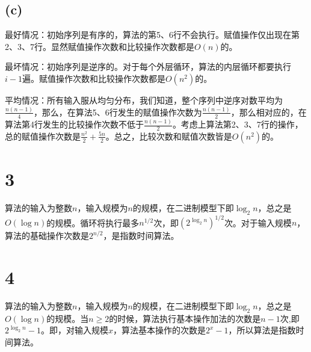 \documentclass{ctexart}
\begin{document}
\subsection*{(c)}

最好情况：初始序列是有序的，算法的第5、6行不会执行。赋值操作仅出现在第2、3、7行。显然赋值操作次数和比较操作次数都是$O(n)$的。

最坏情况：初始序列是逆序的。对于每个外层循环，算法的内层循环都要执行$i-1$遍。赋值操作次数和比较操作次数都是$O(n^2)$的。

平均情况：所有输入服从均匀分布，我们知道，整个序列中逆序对数平均为$\frac{n(n-1)}{4}$，那么，在算法5、6行发生的赋值操作次数为$\frac{n(n-1)}{2}$，那么相对应的，在算法第4行发生的比较操作次数不低于$\frac{n(n-1)}{2}$。考虑上算法第2、3、7行的操作，总的赋值操作次数是$\frac{n^2}{2} + \frac{5n}{2}$。总之，比较次数和赋值次数皆是$O(n^2)$的。







\section*{3}

算法的输入为整数$n$，输入规模为$n$的规模，在二进制模型下即$\log_2 n$，总之是$O(\log n)$的规模。循环将执行最多$n^{1/2}$次，即$\left( 2^{\log_2 n}\right) ^{1/2}$次。对于输入规模$n$，算法的基础操作次数是$2^{n/2}$，是指数时间算法。


\section*{4}

算法的输入为整数$n$，输入规模为$n$的规模，在二进制模型下即$\log_2 n$，总之是$O(\log n)$的规模。当$n\ge 2$的时候，算法执行基本操作加法的次数是$n-1$次,即$2^{\log_2 n}-1$。即，对输入规模$x$，算法基本操作的次数是$2^x-1$，所以算法是指数时间算法。
\end{document}
